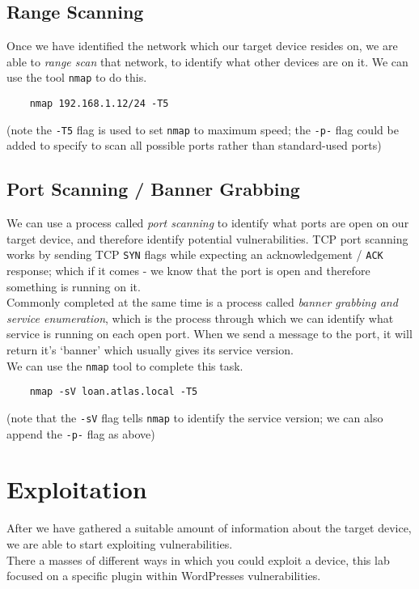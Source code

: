 \subsection{Range Scanning}
Once we have identified the network which our target device resides on, we are able to \textit{range scan} that network, to identify what other devices are on it. We can use the tool \verb|nmap| to do this.
\begin{verbatim}
    nmap 192.168.1.12/24 -T5
\end{verbatim}
(note the \verb|-T5| flag is used to set \verb|nmap| to maximum speed; the \verb|-p-| flag could be added to specify to scan all possible ports rather than standard-used ports)

\subsection{Port Scanning / Banner Grabbing}
We can use a process called \textit{port scanning} to identify what ports are open on our target device, and therefore identify potential vulnerabilities. TCP port scanning works by sending TCP \verb|SYN| flags while expecting an acknowledgement / \verb|ACK| response; which if it comes - we know that the port is open and therefore something is running on it.\\

Commonly completed at the same time is a process called \textit{banner grabbing and service enumeration}, which is the process through which we can identify what service is running on each open port. When we send a message to the port, it will return it's `banner' which usually gives its service version. \\

We can use the \verb|nmap| tool to complete this task.
\begin{verbatim}
    nmap -sV loan.atlas.local -T5
\end{verbatim}
(note that the \verb|-sV| flag tells \verb|nmap| to identify the service version; we can also append the \verb|-p-| flag as above)

\section{Exploitation}
After we have gathered a suitable amount of information about the target device, we are able to start exploiting vulnerabilities.\\

There a masses of different ways in which you could exploit a device, this lab focused on a specific plugin within WordPresses vulnerabilities.

